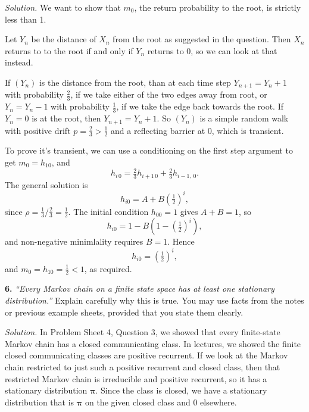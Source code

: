 \documentclass[
  a4paper,
]{article}
\theoremstyle{definition}
\theoremstyle{definition}
\theoremstyle{definition}
\theoremstyle{remark}
\begin{document}
\begin{myanswers}

\emph{Solution.} We want to show that \(m_0\), the return probability to the root, is strictly less than 1.

Let \(Y_n\) be the distance of \(X_n\) from the root as suggested in the question. Then \(X_n\) returns to to the root if and only if \(Y_n\) returns to \(0\), so we can look at that instead.

If \((Y_n)\) is the distance from the root, than at each time step \(Y_{n+1} = Y_n + 1\) with probability \(\frac23\), if we take either of the two edges away from root, or \(Y_n = Y_n - 1\) with probability \(\frac13\), if we take the edge back towards the root. If \(Y_n = 0\) is at the root, then \(Y_{n+1} = Y_n+1\). So \((Y_n)\) is a simple random walk with positive drift \(p = \frac23 > \frac12\) and a reflecting barrier at \(0\), which is transient.

To prove it's transient, we can use a conditioning on the first step argument to get \(m_0 = h_{10}\), and
\[ h_{i\,0} = \tfrac23 h_{i+1\,0} + \tfrac23 h_{i-1,\,0} . \]
The general solution is
\[ h_{i0} = A + B\left(\tfrac12\right)^i , \]
since \(\rho = \frac13 / \frac23 = \frac12\). The initial condition \(h_{00} = 1\) gives \(A + B = 1\), so
\[ h_{i0} = 1 - B\left(1 - \left(\tfrac12\right)^i\right) , \]
and non-negative minimlality requires \(B = 1\). Hence
\[ h_{i0} = \left(\tfrac12\right)^i , \]
and \(m_0 = h_{10} = \frac12 < 1\), as required.

\end{myanswers}

\textbf{6.} \emph{``Every Markov chain on a finite state space has at least one stationary distribution.''} Explain carefully why this is true. You may use facts from the notes or previous example sheets, provided that you state them clearly.

\begin{myanswers}

\emph{Solution.} In Problem Sheet 4, Question 3, we showed that every finite-state Markov chain has a closed communicating class. In lectures, we showed the finite closed communicating classes are positive recurrent. If we look at the Markov chain restricted to just such a positive recurrent and closed class, then that restricted Markov chain is irreducible and positive recurrent, so it has a stationary distribution \(\boldsymbol\pi\). Since the class is closed, we have a stationary distribution that is \(\boldsymbol\pi\) on the given closed class and \(0\) elsewhere.

\end{myanswers}
\end{document}
